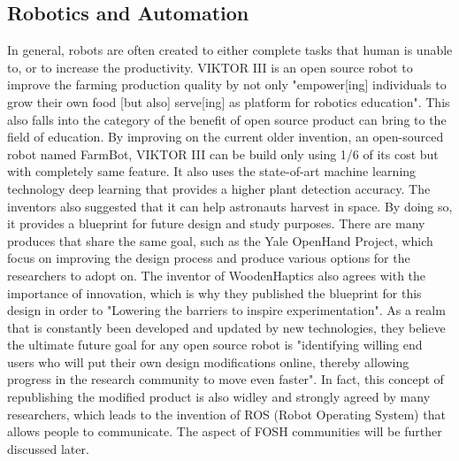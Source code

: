 \documentclass[final-report.tex]{subfiles}
\begin{document}
\subsection{Robotics and Automation}
In general, robots are often created to either complete tasks that human is unable to, or to increase the productivity. 
VIKTOR III is an open source robot to improve the farming production quality by not only 
"empower[ing] individuals to grow their own food [but also] serve[ing] as platform for robotics education". 
This also falls into the category of the benefit of open source product can bring to the field of education. 
By improving on the current older invention, an open-sourced robot named FarmBot, VIKTOR III can be build only using 1/6 of its cost but with completely same feature. 
It also uses the state-of-art machine learning technology deep learning that provides a higher plant detection accuracy. 
The inventors also suggested that it can help astronauts harvest in space. By doing so, it provides a blueprint for future design and study purposes. 
There are many produces that share the same goal, such as the Yale OpenHand Project, which focus on improving the design process and produce various options for the researchers to adopt on.  
The inventor of WoodenHaptics also agrees with the importance of innovation, which is why they published the blueprint for this design in order to "Lowering the barriers to inspire experimentation". 
As a realm that is constantly been developed and updated by new technologies, they believe the ultimate future goal for any open source robot is "identifying willing end users who will put their own design modifications online, thereby allowing progress in the research community to move even faster". 
In fact, this concept of republishing the modified product is also widley and strongly agreed by many researchers, which leads to the invention of ROS (Robot Operating System) that allows people to communicate. 
The aspect of FOSH communities will be further discussed later. 
\end{document}
